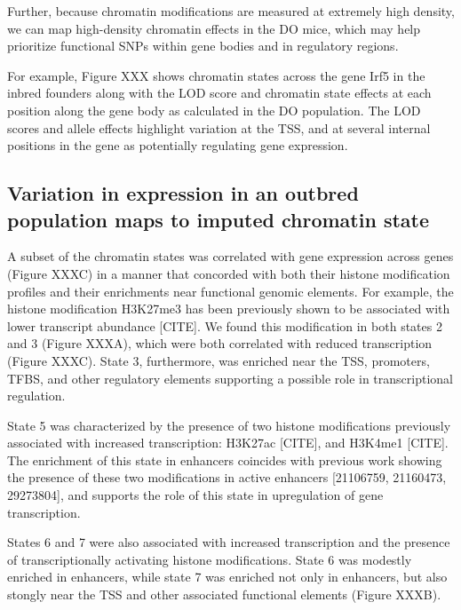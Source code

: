 \documentclass[10pt,letterpaper]{article}
\begin{document}
Further, because chromatin modifications are measured at extremely high
density, we can map high-density chromatin effects in the DO mice, which
may help prioritize functional SNPs within gene bodies and in regulatory
regions.

For example, Figure XXX shows chromatin states across the gene Irf5 in
the inbred founders along with the LOD score and chromatin state effects
at each position along the gene body as calculated in the DO population.
The LOD scores and allele effects highlight variation at the TSS, and at
several internal positions in the gene as potentially regulating gene
expression.

\hypertarget{variation-in-expression-in-an-outbred-population-maps-to-imputed-chromatin-state}{%
\subsection{Variation in expression in an outbred population maps to
imputed chromatin
state}\label{variation-in-expression-in-an-outbred-population-maps-to-imputed-chromatin-state}}

A subset of the chromatin states was correlated with gene expression
across genes (Figure XXXC) in a manner that concorded with both their
histone modification profiles and their enrichments near functional
genomic elements. For example, the histone modification H3K27me3 has
been previously shown to be associated with lower transcript abundance
{[}CITE{]}. We found this modification in both states 2 and 3 (Figure
XXXA), which were both correlated with reduced transcription (Figure
XXXC). State 3, furthermore, was enriched near the TSS, promoters, TFBS,
and other regulatory elements supporting a possible role in
transcriptional regulation.

State 5 was characterized by the presence of two histone modifications
previously associated with increased transcription: H3K27ac {[}CITE{]},
and H3K4me1 {[}CITE{]}. The enrichment of this state in enhancers
coincides with previous work showing the presence of these two
modifications in active enhancers {[}21106759, 21160473, 29273804{]},
and supports the role of this state in upregulation of gene
transcription.

States 6 and 7 were also associated with increased transcription and the
presence of transcriptionally activating histone modifications. State 6
was modestly enriched in enhancers, while state 7 was enriched not only
in enhancers, but also stongly near the TSS and other associated
functional elements (Figure XXXB).
\end{document}
